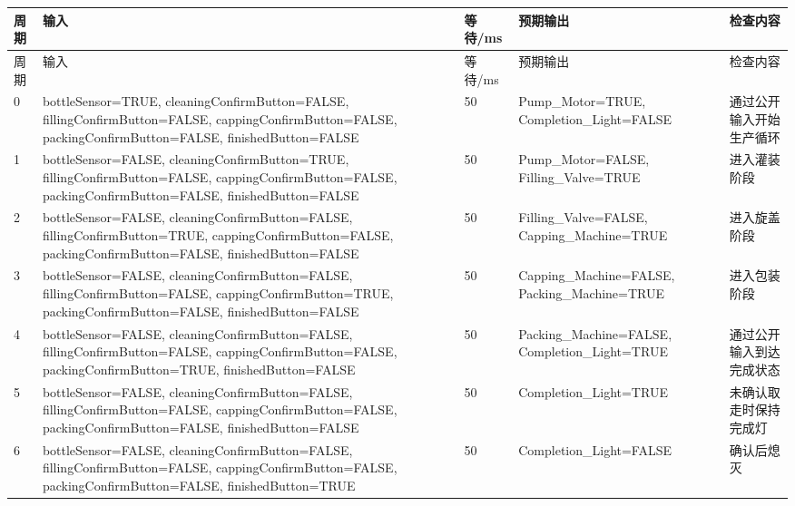 \begin{longtable}{L{1.0cm}L{4.7cm}L{1.4cm}L{4.0cm}L{2.1cm}}

\toprule

周期 & 输入 & 等待/ms & 预期输出 & 检查内容\\

\midrule

\endfirsthead

\toprule

周期 & 输入 & 等待/ms & 预期输出 & 检查内容\\

\midrule

\endhead

0 & bottleSensor=TRUE, cleaningConfirmButton=FALSE, fillingConfirmButton=FALSE, cappingConfirmButton=FALSE, packingConfirmButton=FALSE, finishedButton=FALSE & 50 & Pump\_Motor=TRUE, Completion\_Light=FALSE & 通过公开输入开始生产循环\\

1 & bottleSensor=FALSE, cleaningConfirmButton=TRUE, fillingConfirmButton=FALSE, cappingConfirmButton=FALSE, packingConfirmButton=FALSE, finishedButton=FALSE & 50 & Pump\_Motor=FALSE, Filling\_Valve=TRUE & 进入灌装阶段\\

2 & bottleSensor=FALSE, cleaningConfirmButton=FALSE, fillingConfirmButton=TRUE, cappingConfirmButton=FALSE, packingConfirmButton=FALSE, finishedButton=FALSE & 50 & Filling\_Valve=FALSE, Capping\_Machine=TRUE & 进入旋盖阶段\\

3 & bottleSensor=FALSE, cleaningConfirmButton=FALSE, fillingConfirmButton=FALSE, cappingConfirmButton=TRUE, packingConfirmButton=FALSE, finishedButton=FALSE & 50 & Capping\_Machine=FALSE, Packing\_Machine=TRUE & 进入包装阶段\\

4 & bottleSensor=FALSE, cleaningConfirmButton=FALSE, fillingConfirmButton=FALSE, cappingConfirmButton=FALSE, packingConfirmButton=TRUE, finishedButton=FALSE & 50 & Packing\_Machine=FALSE, Completion\_Light=TRUE & 通过公开输入到达完成状态\\

5 & bottleSensor=FALSE, cleaningConfirmButton=FALSE, fillingConfirmButton=FALSE, cappingConfirmButton=FALSE, packingConfirmButton=FALSE, finishedButton=FALSE & 50 & Completion\_Light=TRUE & 未确认取走时保持完成灯\\

6 & bottleSensor=FALSE, cleaningConfirmButton=FALSE, fillingConfirmButton=FALSE, cappingConfirmButton=FALSE, packingConfirmButton=FALSE, finishedButton=TRUE & 50 & Completion\_Light=FALSE & 确认后熄灭\\

\bottomrule

\end{longtable}

